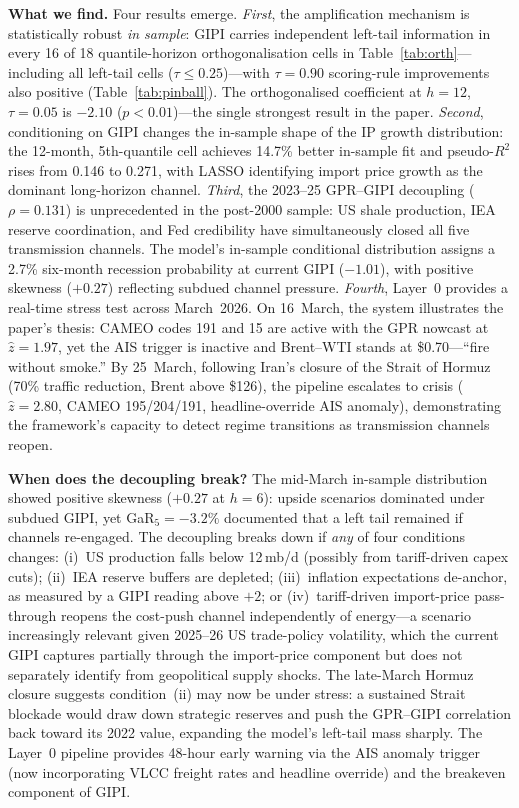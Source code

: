 \documentclass[12pt]{article}
\begin{document}
\noindent\textbf{What we find.}
Four results emerge.
\textit{First}, the amplification mechanism is statistically robust
\textit{in sample}: GIPI carries independent left-tail information in every
16 of 18 quantile-horizon orthogonalisation cells in
Table~\ref{tab:orth}---including all left-tail cells ($\tau \leq 0.25$)---with
$\tau = 0.90$ scoring-rule improvements also positive (Table~\ref{tab:pinball}).
The orthogonalised coefficient at $h=12$, $\tau=0.05$ is $-2.10$
($p<0.01$)---the single strongest result in the paper.
\textit{Second}, conditioning on GIPI changes the in-sample shape of
the IP growth distribution: the 12-month, 5th-quantile cell achieves
14.7\% better in-sample fit and pseudo-$R^2$ rises from 0.146 to 0.271,
with LASSO identifying import price growth as the dominant long-horizon
channel.
\textit{Third}, the 2023--25 GPR--GIPI decoupling ($\rho=0.131$) is
unprecedented in the post-2000 sample: US shale production, IEA reserve
coordination, and Fed credibility have simultaneously closed all five
transmission channels.
The model's in-sample conditional distribution assigns a 2.7\% six-month
recession probability at current GIPI ($-1.01$), with positive skewness
($+0.27$) reflecting subdued channel pressure.
\textit{Fourth}, Layer~0 provides a real-time stress test across
March~2026.
On 16~March, the system illustrates the paper's thesis: CAMEO codes 191
and 15 are active with the GPR nowcast at $\hat{z}=1.97$, yet the AIS
trigger is inactive and Brent--WTI stands at \$0.70---``fire without smoke.''
By 25~March, following Iran's closure of the Strait of Hormuz (70\%
traffic reduction, Brent above \$126), the pipeline escalates to crisis
($\hat{z}=2.80$, CAMEO 195/204/191, headline-override AIS anomaly),
demonstrating the framework's capacity to detect regime transitions
as transmission channels reopen.

\noindent\textbf{When does the decoupling break?}
The mid-March in-sample distribution showed positive skewness ($+0.27$ at $h=6$):
upside scenarios dominated under subdued GIPI, yet GaR$_5 = -3.2\%$ documented
that a left tail remained if channels re-engaged.
The decoupling breaks down if \textit{any} of four conditions changes:
(i)~US production falls below 12\,mb/d (possibly from tariff-driven capex
cuts); (ii)~IEA reserve buffers are depleted; (iii)~inflation expectations
de-anchor, as measured by a GIPI reading above $+2$; or
(iv)~tariff-driven import-price pass-through reopens the cost-push
channel independently of energy---a scenario increasingly relevant
given 2025--26 US trade-policy volatility, which the current GIPI
captures partially through the import-price component but does not
separately identify from geopolitical supply shocks.
The late-March Hormuz closure suggests condition~(ii) may now be under stress:
a sustained Strait blockade would draw down strategic reserves and push
the GPR--GIPI correlation back toward its 2022 value, expanding the model's
left-tail mass sharply.
The Layer~0 pipeline provides 48-hour early warning via the AIS anomaly
trigger (now incorporating VLCC freight rates and headline override)
and the breakeven component of GIPI.
\end{document}
